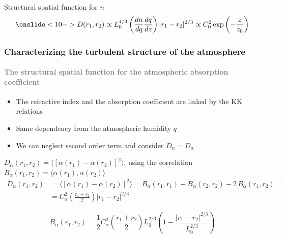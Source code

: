 \documentclass[aspectratio=169]{beamer}
\begin{document}
\begin{frame}
\begin{columns}
\begin{column}{0.25\textwidth}
        \end{column}
    \end{columns}
    \begin{exampleblock}{Structural spatial function for $n$}
        \begin{equation}
            \onslide<10->D(r_1, r_2) \propto L_0^{4/3} \left(\frac{dn}{dq}\frac{dq}{dz}\right)\lvert r_1 - r_2\rvert^{2/3} \propto C_0^2 \exp\left(-\frac{z}{z_0}\right)\nonumber
        \end{equation}
    \end{exampleblock}
\end{frame}

\begin{frame}
    \frametitle{Characterizing the turbulent structure of the atmosphere}
    \framesubtitle{\textcolor{gray}{The structural spatial function for the atmospheric absorption coefficient}}
    \begin{itemize}[<+->]
        \item The refractive index and the absorption coefficient are linked by the KK relations
        \item Same dependency from the atmospheric humidity $q$
        \item We can neglect second order term and consider $D_n = D_\alpha$
    \end{itemize}
    $D_\alpha(r_1,r_2) = \langle[\alpha(r_1)-\alpha(r_2)]^2\rangle$, using the correlation $B_\alpha(r_1, r_2) = \langle\alpha(r_1), \alpha(r_2)\rangle$
    \begin{equation}
        \begin{split}
            D_\alpha(r_1, r_2)&=\langle[\alpha(r_1) -\alpha(r_2)]^2\rangle = B_\alpha(r_1, r_1) + B_\alpha(r_2, r_2) - 2\,B_\alpha(r_1, r_2)  = \\
            &=C_\alpha^2\left(\frac{r_1+r_2}{2}\right)\lvert r_1 - r_2\rvert^{2/3}
        \end{split}\nonumber
    \end{equation}

    \begin{equation}
        B_\alpha(r_1, r_2) = \frac{1}{2} C_\alpha^2 \left(\frac{r_1+r_2}{2}\right) L_0^{2/3}\left(1-\frac{\lvert r_1 - r_2 \rvert^{2/3}}{L_0^{2/3}}\right)\nonumber
    \end{equation}
\end{frame}
\end{document}
